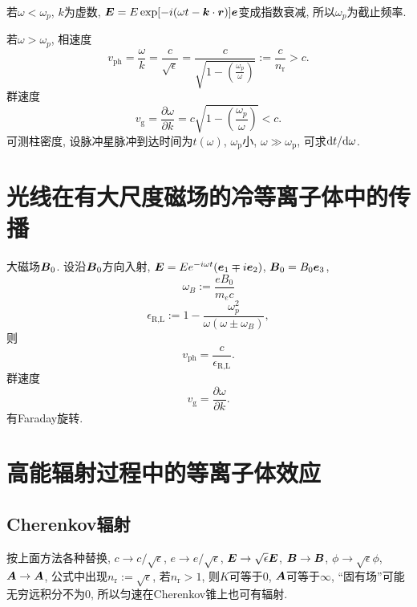 若$\omega<\omega_p$, $k$为虚数, $\boldsymbol{E}=E\exp[-i(\omega t-\boldsymbol{k}\cdot\boldsymbol{r})]\boldsymbol{e}$变成指数衰减, 所以$\omega_p$为截止频率.

若$\omega>\omega_p$, 相速度
\begin{equation}
    v_\text{ph}=\frac{\omega}{k}=\frac{c}{\sqrt{\epsilon}}=\frac{c}{\sqrt{1-\left(\frac{\omega_p}{\omega}\right)}}:=\frac{c}{n_\text{r}}>c.
\end{equation}
群速度
\begin{equation}
    v_\text{g}=\frac{\partial\omega}{\partial k}=c\sqrt{1-\left(\frac{\omega_p}{\omega}\right)}<c.
\end{equation}
可测柱密度, 设脉冲星脉冲到达时间为$t(\omega)$, $\omega_\text{p}$小, $\omega\gg\omega_\text{p}$, 可求$\mathrm{d} t/\mathrm{d}\omega$.

\section{光线在有大尺度磁场的冷等离子体中的传播}

大磁场$\boldsymbol{B}_0$. 设沿$\boldsymbol{B}_0$方向入射, $\boldsymbol{E}=Ee^{-i\omega t}(\boldsymbol{e}_1\mp i\boldsymbol{e}_2)$, $\boldsymbol{B}_0=B_0\boldsymbol{e}_3$,
\begin{equation}
    \omega_B:=\frac{eB_0}{m_ec}
\end{equation}
\begin{equation}
    \epsilon_\text{R,L}:=1-\frac{\omega_p^2}{\omega(\omega\pm\omega_B)},
\end{equation}
则
\begin{equation}
    v_\text{ph}=\frac{c}{\epsilon_\text{R,L}}.
\end{equation}
群速度
\begin{equation}
    v_\text{g}=\frac{\partial\omega}{\partial k}.
\end{equation}
有Faraday旋转.

\section{高能辐射过程中的等离子体效应}

\subsection{Cherenkov辐射}
按上面方法各种替换, $c\to c/\sqrt{\epsilon}$, $e\to e/\sqrt{\epsilon}$, $\boldsymbol{E}\to \sqrt{\epsilon}\boldsymbol{E}$, $\boldsymbol{B}\to \boldsymbol{B}$, $\phi\to \sqrt{\epsilon}\phi$, $\boldsymbol{A}\to \boldsymbol{A}$, 公式中出现$n_\text{r}:=\sqrt{\epsilon}$, 若$n_\text{r}>1$, 则$K$可等于$0$, $\boldsymbol{A}$可等于$\infty$, ``固有场''可能无穷远积分不为$0$, 所以匀速在Cherenkov锥上也可有辐射.


